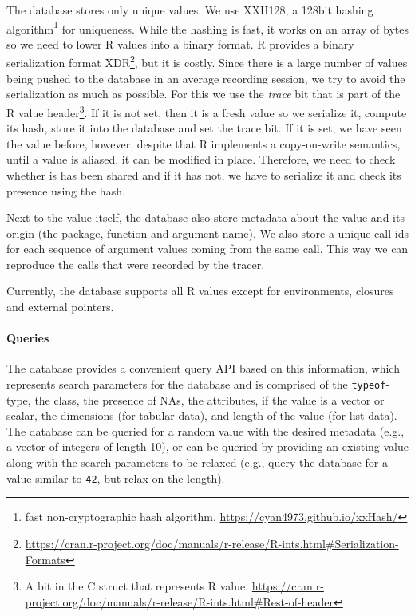 \documentclass[sigplan,anonymous,review]{acmart}
\begin{document}
The database stores only unique values.
We use XXH128, a 128bit hashing algorithm\footnote{fast non-cryptographic hash algorithm, \Cf \url{https://cyan4973.github.io/xxHash/}} for uniqueness.
While the hashing is fast, it works on an array of bytes so we need to lower R values into a binary format.
R provides a binary serialization format XDR\footnote{\Cf \url{https://cran.r-project.org/doc/manuals/r-release/R-ints.html\#Serialization-Formats}}, but it is costly.
Since there is a large number of values being pushed to the database in an average recording session, we try to avoid the serialization as much as possible.
For this we use the \emph{trace} bit that is part of the R value header\footnote{A bit in the  C struct that represents R value. \Cf \url{https://cran.r-project.org/doc/manuals/r-release/R-ints.html\#Rest-of-header}}.
If it is not set, then it is a fresh value so we serialize it, compute its hash, store it into the database and set the trace bit.
If it is set, we have seen the value before, however, despite that R implements a copy-on-write semantics, until a value is aliased, it can be modified in place.
Therefore, we need to check whether is has been shared and if it has not, we have to serialize it and check its presence using the hash.


Next to the value itself, the database also store metadata about the value and its origin (the package, function and argument name).
We also store a unique call ids for each sequence of argument values coming from the same call.
This way we can reproduce the calls that were recorded by the tracer.

Currently, the database supports all R values except for environments, closures and external pointers.

\paragraph{Queries}

The database provides a convenient query API based on this information, which represents search parameters for the database and is comprised of the {\tt typeof}-type, the class, the presence of NAs, the attributes, if the value is a vector or scalar, the dimensions (for tabular data), and length of the value (for list data).
The database can be queried for a random value with the desired metadata (e.g., a vector of integers of length 10), or can be queried by providing an existing value along with the search parameters to be relaxed (e.g., query the database for a value similar to {\tt 42}, but relax on the length).
\end{document}
